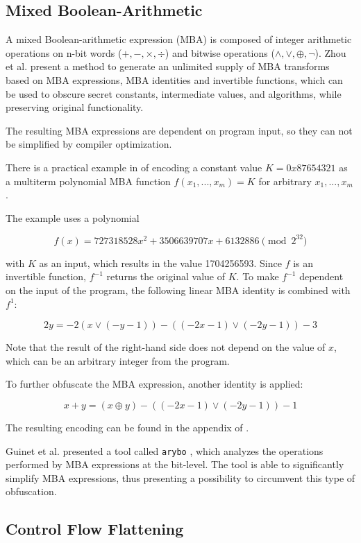 \documentclass[
  digital, %
  table,   %
  twoside, %
  nolof,     %
  nolot,     %
]{fithesis3}
\theoremstyle{definition}
\begin{document}
\subsection{Mixed Boolean-Arithmetic} \label{mba}
A mixed Boolean-arithmetic expression (MBA) is composed of integer arithmetic operations on n-bit words ($+,-,\times, \div$) and bitwise operations ($\wedge, \vee, \oplus, \neg$). Zhou et al. \cite{mba_zhou} present a method to generate an unlimited supply of MBA transforms based on MBA expressions, MBA identities and invertible functions, which can be used to obscure secret constants, intermediate values, and algorithms, while preserving original functionality. %

The resulting MBA expressions are dependent on program input, so they can not be simplified by compiler optimization. 

There is a practical example in \cite{mba_zhou} of encoding a constant value $K=0x87654321$ as a multiterm polynomial MBA function $f(x_1,...,x_m) = K$ for arbitrary $x_1,...,x_m$.

The example uses a polynomial

$$ f(x) = 727318528x^2 + 3506639707x + 6132886 \pmod{2^{32}}$$

with $K$ as an input, which results in the value 1704256593. Since $f$ is an invertible function, $f^{-1}$ returns the original value of $K$. To make $f^{-1}$ dependent on the input of the program, the following linear MBA identity is combined with $f^1$:

$$2y = -2(x \vee(-y-1))-((-2x-1)\vee(-2y-1))-3$$

Note that the result of the right-hand side does not depend on the value of $x$, which can be an arbitrary integer from the program.  

To further obfuscate the MBA expression, another identity is applied:

$$x + y = (x\oplus y) - ((-2x-1)\vee(-2y-1))-1$$

The resulting encoding can be found in the appendix of \cite{mba_zhou}.

Guinet et al. presented a tool called \texttt{arybo} \cite{guinet_arybo}, which analyzes the operations performed by MBA expressions at the bit-level. The tool is able to significantly simplify MBA expressions, thus presenting a possibility to circumvent this type of obfuscation. 

\subsection{Control Flow Flattening} \label{flatten}
\end{document}

